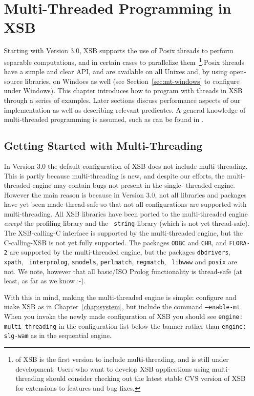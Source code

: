 \chapter{Multi-Threaded Programming in XSB} \label{chap:threads}

Starting with Version 3.0, XSB supports the use of Posix threads to
perform separable computations, and in certain cases to parallelize
them~\footnote{\version{} of XSB is the first version to include
  multi-threading, and is still under development.  Users who want to
  develop XSB applications using multi-threading should consider
  checking out the latest stable CVS version of XSB for extensions to
  features and bug fixes.}.Posix threads have a simple and clear API,
and are available on all Unixes and, by using open-source libraries,
on Windoes as well (see Section~\ref{sec:mt-windows} to configure
under Windows).  This chapter introduces how to program with threads
in XSB through a series of examples.  Later sections discuss
performance aspects of our implementation as well as describing
relevant predicates.  A general knowledge of multi-threaded
programming is assumed, such as can be found in \cite{LewB98,Bute97}.

\section{Getting Started with Multi-Threading}
%
In Version 3.0 the default configuration of XSB does not include
multi-threading.  This is partly because multi-threading is new, and
despite our efforts, the multi-threaded engine may contain bugs not
present in the single- threaded engine.  However the main reason is
because in Version 3.0, not all libraries and packages have yet been
made thread-safe so that not all configurations are supported with
multi-threading.  All XSB libraries have been ported to the
multi-threaded engine {\em except} the profiling library and the {\tt
  string} library (which is not yet thread-safe).  The XSB-calling-C
interface is supported by the multi-threaded engine, but the
C-calling-XSB is not yet fully supported.  The packages {\tt ODBC} and
{\tt CHR}, and {\tt FLORA-2} are supported by the multi-threaded
engine, but the packages {\tt dbdrivers}, {\tt xpath}, {\tt
  interprolog}, {\tt smodels}, {\tt perlmatch}, {\tt regmatch}, {\tt
  libwww} and {\tt posix} are not.  We note, however that all
basic/ISO Prolog functionality is thread-safe (at least, as far as we
know :-).

With this in mind, making the multi-threaded engine is simple:
configure and make XSB as in Chapter~\ref{chap:system}, but include
the command {\tt --enable-mt}.  When you invoke the newly made
configuration of XSB you should see {\tt engine: multi-threading} in
the configuration list below the banner rather than {\tt engine:
  slg-wam} as in the sequential engine.

